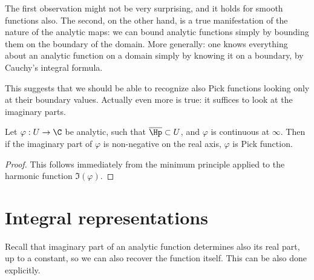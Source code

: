 The first observation might not be very surprising, and it holds for smooth functions also. The second, on the other hand, is a true manifestation of the nature of the analytic maps: we can bound analytic functions simply by bounding them on the boundary of the domain. More generally: one knows everything about an analytic function on a domain simply by knowing it on a boundary, by Cauchy's integral formula.

This suggests that we should be able to recognize also Pick functions looking only at their boundary values. Actually even more is true: it suffices to look at the imaginary parts.

\begin{prop}
	Let $\varphi : U \to \C$ be analytic, such that $\overline{\Hp} \subset U$, and $\varphi$ is continuous at $\infty$. Then if the imaginary part of $\varphi$ is non-negative on the real axis, $\varphi$ is Pick function.
\end{prop}
\begin{proof}
	This follows immediately from the minimum principle applied to the harmonic function $\Im(\varphi)$.
\end{proof}

\section{Integral representations}

Recall that imaginary part of an analytic function determines also its real part, up to a constant, so we can also recover the function itself. This can be also done explicitly.

